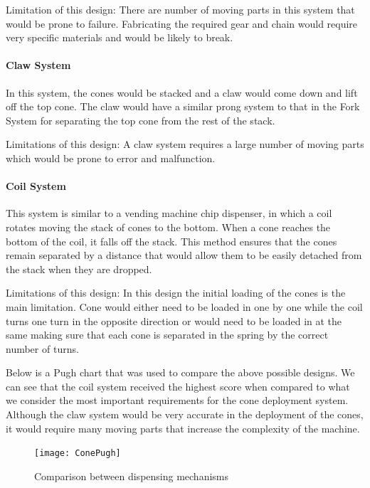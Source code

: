 \documentclass[11pt]{report}
\newenvironment{indpar}[1]%
{\begin{list}{}%
         {\setlength{\leftmargin}{#1}}%
         \item[]%
}
{\end{list}}
\begin{document}
\begin{indpar}{1cm}
Limitation of this design:
There are number of moving parts in this system that would be prone to failure. Fabricating the required gear and chain would require very specific materials and would be likely to break.
\end{indpar}

\paragraph{Claw System}
In this system, the cones would be stacked and a claw would come down and lift off the top cone. The claw would have a similar prong system to that in the Fork System for separating the top cone from the rest of the stack.

\begin{indpar}{1cm}
Limitations of this design:
A claw system requires a large number of moving parts which would be prone to error and malfunction.
\end{indpar}

\paragraph{Coil System}
This system is similar to a vending machine chip dispenser, in which a coil rotates moving the stack of cones to the bottom. When a cone reaches the bottom of the coil, it falls off the stack. This method ensures that the cones remain separated by a distance that would allow them to be easily detached from the stack when they are dropped.

\begin{indpar}{1cm}
Limitations of this design:
In this design the initial loading of the cones is the main limitation. Cone would either need to be loaded in one by one while the coil turns one turn in the opposite direction or would need to be loaded in at the same making sure that each cone is separated in the spring by the correct number of turns.
\end{indpar}

Below is a Pugh chart that was used to compare the above possible designs. We can see that the coil system received the highest score when compared to what we consider the most important requirements for the cone deployment system. Although the claw system would be very accurate in the deployment of the cones, it would require many moving parts that increase the complexity of the machine.
\begin{figure}[h!]
  \begin{center}
    \texttt{[image: ConePugh]}
  \end{center}
  \caption{Comparison between dispensing mechanisms}
\end{figure}
\end{document}
